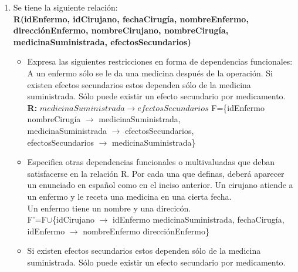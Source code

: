 \documentclass[a4paper, 12pt]{report}
\begin{document}
\begin{enumerate}
\item Se tiene la siguiente relación:\\
    \textbf{R(idEnfermo, idCirujano, fechaCirugía, nombreEnfermo,
        direcciónEnfermo, nombreCirujano, nombreCirugía, medicinaSuministrada,
        efectosSecundarios)}
    \begin{itemize}
        \item Expresa las siguientes restricciones en forma de dependencias
            funcionales:
            A un enfermo sólo se le da una medicina después de la operación.
            Si existen efectos secundarios estos dependen sólo de la medicina
            suministrada. Sólo puede existir un efecto secundario por
            medicamento.\\
            	\textbf{R:} $medicinaSuministrada \rightarrow efectosSecundarios$
            F=\{idEnfermo nombreCirugía $\rightarrow$ medicinaSuministrada,\\
                medicinaSuministrada $\rightarrow$ efectosSecundarios,\\
                efectosSecundarios $\rightarrow$ medicinaSuministrada\}
        \item Especifica otras dependencias funcionales o multivaluadas que
            deban satisfacerse en la relación R. Por cada una que definas,
            deberá aparecer un enunciado en español como en el inciso anterior.
            Un cirujano atiende a un enfermo y le receta una medicina en una
            cierta fecha.\\
            Un enfermo tiene un nombre y una direcicón.\\
            F'=F$\cup$\{idCirujano $\rightarrow$ idEnfermo medicinaSuministrada,
                            fechaCirugía,\\
                        idEnfermo $\rightarrow$ nombreEnfermo direcciónEnfermo\}

		\item Si existen efectos secundarios estos dependen sólo de la medicina suministrada. Sólo puede existir un efecto secundario por medicamento.

	\end{itemize}
\end{enumerate}
\end{document}
